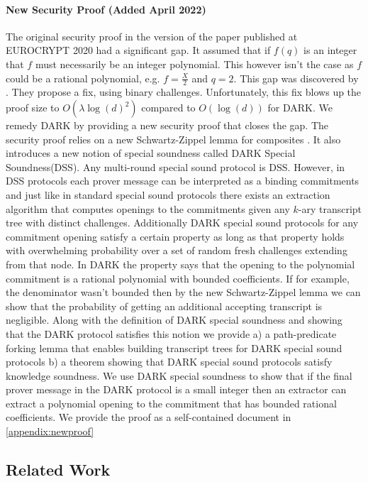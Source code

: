 \paragraph{New Security Proof (Added April 2022)}
The original security proof in the version of the paper published at EUROCRYPT 2020\cite{EC:BunFisSze20} had a significant gap. It assumed that if $f(q)$ is an integer that $f$ must necessarily be an integer polynomial. This however isn't the case as $f$ could be a rational polynomial, e.g. $f=\frac{X}{2}$ and $q=2$. This gap was discovered by \cite{C:BHRRS21}. They propose a fix, using binary challenges. Unfortunately, this fix blows up the proof size to $O(\lambda \log(d)^2)$ compared to $O(\log(d))$ for DARK. We remedy DARK by providing a new security proof that closes the gap. The security proof relies on a new Schwartz-Zippel lemma for composites \cite{EPRINT:BunFis22}. It also introduces a new notion of special soundness called DARK Special Soundness(DSS). Any multi-round special sound protocol is DSS. However, in DSS protocols each prover message can be interpreted as a binding commitments and just like in standard special sound protocols there exists an extraction algorithm that computes openings to the commitments given any $k$-ary transcript tree with distinct challenges. Additionally DARK special sound protocols for any commitment opening satisfy a certain property as long as that property holds with overwhelming probability over a set of random fresh challenges extending from that node. In DARK the property says that the opening to the polynomial commitment is a rational polynomial with bounded coefficients. If for example, the denominator wasn't bounded then by the new Schwartz-Zippel lemma we can show that the probability of getting an additional accepting transcript is negligible. Along with the definition of DARK special soundness and showing that the DARK protocol satisfies this notion we provide a) a path-predicate forking lemma that enables building transcript trees for DARK special sound protocols b) a theorem showing that DARK special sound protocols satisfy knowledge soundness. We use DARK special soundness to show that if the final prover message in the DARK protocol is a small integer then an extractor can extract a polynomial opening to the commitment that has bounded rational coefficients. 
We provide the proof as a self-contained document in \cref{appendix:newproof}

\subsection{Related Work}

